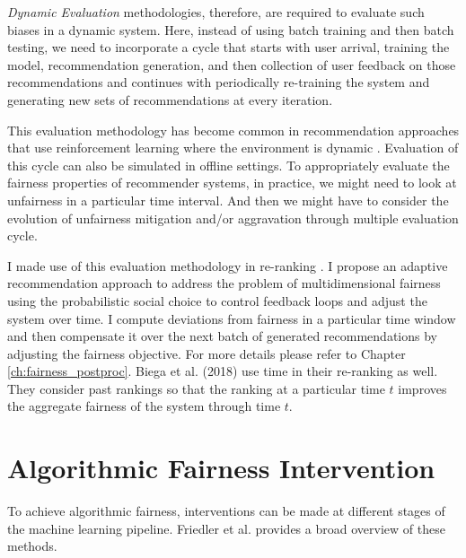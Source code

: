         \textit{Dynamic Evaluation} methodologies, therefore, are required to evaluate such biases in a dynamic system. Here, instead of using batch training and then batch testing, we need to incorporate a cycle that starts with user arrival, training the model, recommendation generation, and then collection of user feedback on those recommendations and continues with periodically re-training the system and generating new sets of recommendations at every iteration.
        
        This evaluation methodology has become common in recommendation approaches that use reinforcement learning where the environment is dynamic \cite{Lihong2010bandit,Zheng2018DRN}. Evaluation of this cycle can also be simulated in offline settings. To appropriately evaluate the fairness properties of recommender systems, in practice, we might need to look at unfairness in a particular time interval. And then we might have to consider the evolution of unfairness mitigation and/or aggravation through multiple evaluation cycle.
        
        I made use of this evaluation methodology in re-ranking \cite{sonboli2020dynm}. I propose an adaptive recommendation approach to address the problem of multidimensional fairness using the probabilistic social choice to control feedback loops and adjust the system over time. I compute deviations from fairness in a particular time window and then compensate it over the next batch of generated recommendations by adjusting the fairness objective. For more details please refer to Chapter \ref{ch:fairness_postproc}. Biega et al. (2018) \cite{biega2018equity} use time in their re-ranking as well. They consider past rankings so that the ranking at a particular time $t$ improves the aggregate fairness of the system through time $t$.
        

\section{Algorithmic Fairness Intervention}
    To achieve algorithmic fairness, interventions can be made at different stages of the machine learning pipeline. Friedler et al. \cite{Friedler2019} provides a broad overview of these methods.

